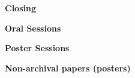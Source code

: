 \vspace{1ex}
\item[6:00--6:15] {\bfseries  Closing}

\vspace{1ex}
\item[] {\bfseries Oral Sessions}

\vspace{1ex}
\item[] {\bfseries Poster Sessions}

\vspace{1ex}
\item[] {\bfseries Non-archival papers (posters)}
